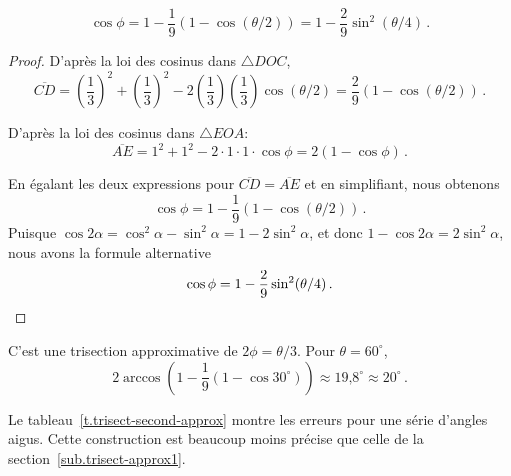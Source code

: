 \begin{theorem}
\[
\cos\phi=1 - \frac{1}{9}(1-\cos(\theta/2))=1 - \frac{2}{9}\sin^2(\theta/4)\,.
\]
\end{theorem}

\begin{proof} D'après la loi des cosinus dans $\triangle DOC$,
\[
\overline{CD}= \left(\frac{1}{3}\right)^2+\left(\frac{1}{3}\right)^2-2\left(\frac{1}{3}\right)\left(\frac{1}{3}\right)\cos (\theta/2)=\frac{2}{9}(1-\cos(\theta/2))\,.
\]

D'après la loi des cosinus dans  $\triangle EOA$:
\[
\overline{AE} = 1^2+1^2-2\cdot 1\cdot 1\cdot \cos \phi=2(1-\cos \phi)\,.
\]



En égalant les deux expressions pour $\overline{CD}=\overline{AE}$ et en simplifiant, nous obtenons 
\[
\cos \phi = 1 - \frac{1}{9}(1-\cos(\theta/2))\,.
\]
Puisque $\cos 2\alpha= \cos^2 \alpha-\sin^2\alpha=1-2\sin^2\alpha$, et donc $1-\cos 2\alpha=2\sin^2\alpha$, nous avons la formule alternative 
\[
\cos \phi = 1 - \frac{2}{9}\sin^2(\theta/4)\,.\qedhere
\]
\end{proof}

C'est une trisection approximative de $2\phi=\theta/3$. Pour $\theta=60^\circ$,
\[
2\arccos\left(1 - \frac{1}{9}(1-\cos 30^\circ)\right)\approx \mbox{19,8}^\circ\approx 20^\circ\,.
\]

Le tableau~\ref{t.trisect-second-approx} montre les erreurs pour une série d'angles aigus. Cette construction est beaucoup moins précise que celle de la section~\ref{sub.trisect-approx1}.

